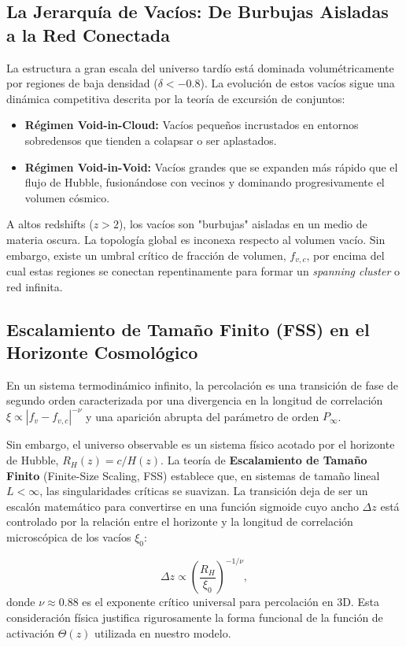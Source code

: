 \documentclass[12pt, a4paper]{article}
\theoremstyle{plain}
\theoremstyle{definition}
\begin{document}
\subsection{La Jerarquía de Vacíos: De Burbujas Aisladas a la Red Conectada}

La estructura a gran escala del universo tardío está dominada volumétricamente por regiones de baja densidad ($\delta < -0.8$). La evolución de estos vacíos sigue una dinámica competitiva descrita por la teoría de excursión de conjuntos:
\begin{itemize}
    \item \textbf{Régimen Void-in-Cloud:} Vacíos pequeños incrustados en entornos sobredensos que tienden a colapsar o ser aplastados.
    \item \textbf{Régimen Void-in-Void:} Vacíos grandes que se expanden más rápido que el flujo de Hubble, fusionándose con vecinos y dominando progresivamente el volumen cósmico.
\end{itemize}

A altos redshifts ($z > 2$), los vacíos son "burbujas" aisladas en un medio de materia oscura. La topología global es inconexa respecto al volumen vacío. Sin embargo, existe un umbral crítico de fracción de volumen, $f_{v,c}$, por encima del cual estas regiones se conectan repentinamente para formar un \textit{spanning cluster} o red infinita.

\subsection{Escalamiento de Tamaño Finito (FSS) en el Horizonte Cosmológico}

En un sistema termodinámico infinito, la percolación es una transición de fase de segundo orden caracterizada por una divergencia en la longitud de correlación $\xi \propto |f_v - f_{v,c}|^{-\nu}$ y una aparición abrupta del parámetro de orden $P_{\infty}$.

Sin embargo, el universo observable es un sistema físico acotado por el horizonte de Hubble, $R_H(z) = c/H(z)$. La teoría de \textbf{Escalamiento de Tamaño Finito} (Finite-Size Scaling, FSS) establece que, en sistemas de tamaño lineal $L < \infty$, las singularidades críticas se suavizan. La transición deja de ser un escalón matemático para convertirse en una función sigmoide cuyo ancho $\Delta z$ está controlado por la relación entre el horizonte y la longitud de correlación microscópica de los vacíos $\xi_0$:

\begin{equation}
\Delta z \propto \left(\frac{R_H}{\xi_0}\right)^{-1/\nu},
\label{eq:fss_width}
\end{equation}
donde $\nu \approx 0.88$ es el exponente crítico universal para percolación en 3D. Esta consideración física justifica rigurosamente la forma funcional de la función de activación $\Theta(z)$ utilizada en nuestro modelo.
\end{document}
